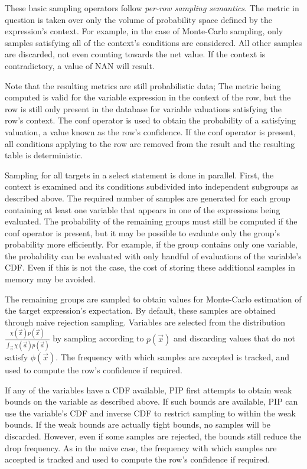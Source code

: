 These basic sampling operators follow \textit{per-row sampling semantics}.  The metric in question is taken over only the volume of probability space defined by the expression's context.  For example, in the case of Monte-Carlo sampling, only samples satisfying all of the context's conditions are considered.  All other samples are discarded, not even counting towards the net value.  If the context is contradictory, a value of NAN will result.

Note that the resulting metrics are still probabilistic data; The metric being computed is valid for the variable expression in the context of the row, but the row is still only present in the database for variable valuations satisfying the row's context.  The conf operator is used to obtain the probability of a satisfying valuation, a value known as the row's confidence.  If the conf operator is present, all conditions applying to the row are removed from the result and the resulting table is deterministic.

Sampling for all targets in a select statement is done in parallel.  First, the context is examined and its conditions subdivided into independent subgroups as described above.  The required number of samples are generated for each group containing at least one variable that appears in one of the expressions being evaluated.  The probability of the remaining groups must still be computed if the conf operator is present, but it may be possible to evaluate only the group's probability more efficiently.  For example, if the group contains only one variable, the probability can be evaluated with only handful of evaluations of the variable's CDF.  Even if this is not the case, the cost of storing these additional samples in memory may be avoided.

The remaining groups are sampled to obtain values for Monte-Carlo estimation of the target expression's expectation.  By default, these samples are obtained through naive rejection sampling.  Variables are selected from the distribution $\frac{\chi(\vec{x})p(\vec{x})}{\int_{\vec{a}} \chi(\vec{a})p(\vec{a})}$ by sampling according to $p(\vec{x})$ and discarding values that do not satisfy $\phi(\vec{x})$.  The frequency with which samples are accepted is tracked, and used to compute the row's confidence if required.

If any of the variables have a CDF available, PIP first attempts to obtain weak bounds on the variable as described above.  If such bounds are available, PIP can use the variable's CDF and inverse CDF to restrict sampling to within the weak bounds.  If the weak bounds are actually tight bounds, no samples will be discarded.  However, even if some samples are rejected, the bounds still reduce the drop frequency.  As in the naive case, the frequency with which samples are accepted is tracked and used to compute the row's confidence if required.

